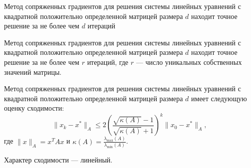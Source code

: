 \begin{theorem}
    Метод сопряженных градиентов для решения системы линейных уравнений с
    квадратной положительно определенной матрицей размера $d$ находит точное решение за не более
    чем $d$ итераций
\end{theorem}

\begin{theorem}
    Метод сопряженных градиентов для решения системы линейных уравнений с
    квадратной положительно определенной матрицей размера $d$ находит точное решение за не более
    чем $r$ итераций, где $r$ --– число уникальных собственных значений
    матрицы.
\end{theorem}

\begin{theorem}
    Метод сопряженных градиентов для решения системы линейных уравнений с квадратной положительно определенной матрицей размера $d$ имеет следующую оценку сходимости:
    $$ \|x_k - x^*\|_A \leq 2 \left( \frac{\sqrt{\kappa(A)} - 1}{\sqrt{\kappa(A)} + 1} \right)^k \|x_0 - x^*\|_A, $$
    где $ \|x\|_A = x^T A x $ и $ \kappa(A) = \frac{\lambda_{\max}(A)}{\lambda_{\min}(A)} $.
\end{theorem}

Характер сходимости --- линейный.
